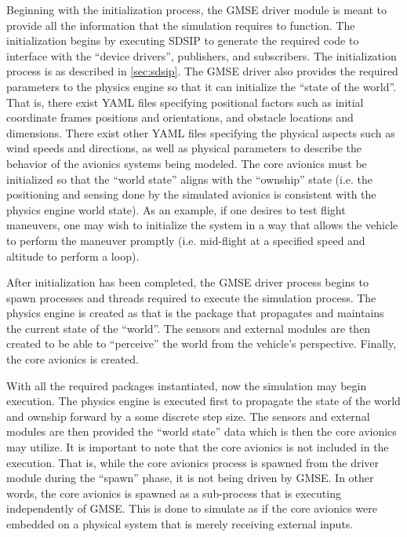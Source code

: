 Beginning with the initialization process, the GMSE driver module is meant to provide all the information that the
simulation requires to function. The initialization begins by executing SDSIP to generate the required code to interface
with the ``device drivers'', publishers, and subscribers. The initialization process is as described in
\autoref{sec:sdsip}. The GMSE driver also provides the required parameters to the physics engine so that it can
initialize the ``state of the world''. That is, there exist YAML files specifying positional factors such as initial
coordinate frames positions and orientations, and obstacle locations and dimensions. There exist other YAML files
specifying the physical aspects such as wind speeds and directions, as well as physical parameters to describe the
behavior of the avionics systems being modeled. The core avionics must be initialized so that the ``world state'' aligns
with the ``ownship'' state (i.e. the positioning and sensing done by the simulated avionics is consistent with the
physics engine world state). As an example, if one desires to test flight maneuvers, one may wish to initialize the
system in a way that allows the vehicle to perform the maneuver promptly (i.e. mid-flight at a specified speed and
altitude to perform a loop).

After initialization has been completed, the GMSE driver process begins to spawn processes and threads required to
execute the simulation process. The physics engine is created as that is the package that propagates and maintains the
current state of the ``world''. The sensors and external modules are then created to be able to ``perceive'' the world
from the vehicle's perspective. Finally, the core avionics is created.

With all the required packages instantiated, now the simulation may begin execution. The physics engine is executed
first to propagate the state of the world and ownship forward by a some discrete step size. The sensors and external
modules are then provided the ``world state'' data which is then the core avionics may utilize. It is important to note
that the core avionics is not included in the execution. That is, while the core avionics process is spawned from the
driver module during the ``spawn'' phase, it is not being driven by GMSE. In other words, the core avionics is spawned
as a sub-process that is executing independently of GMSE. This is done to simulate as if the core avionics were embedded
on a physical system that is merely receiving external inputs.


